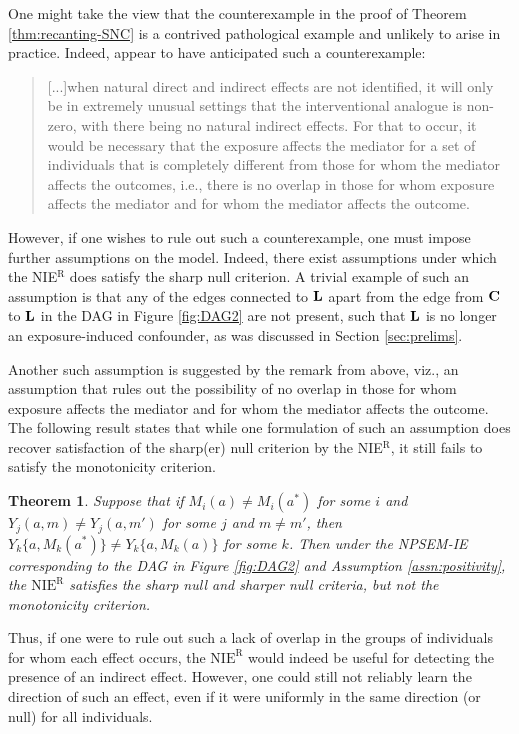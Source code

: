 \documentclass[12pt]{article}
\newtheorem{theorem}{Theorem}
\begin{document}
One might take the view that the counterexample in the proof of Theorem \ref{thm:recanting-SNC} is a contrived pathological example and unlikely to arise in practice. Indeed, \cite{vanderweele2017mediation} appear to have anticipated such a counterexample:
\begin{quote}
    [...]when natural direct and indirect effects are not identified, it will only be in extremely unusual settings that the interventional analogue is non-zero, with there being no natural indirect effects. For that to occur, it would be necessary that the exposure affects the mediator for a set of individuals that is completely different from those for whom the mediator affects the outcomes, i.e., there is no overlap in those for whom exposure affects the mediator and for whom the mediator affects the outcome.
\end{quote}
However, if one wishes to rule out such a counterexample, one must impose further assumptions on the model. Indeed, there exist assumptions under which the NIE$^{\mathrm{R}}$ does satisfy the sharp null criterion. A trivial example of such an assumption is that any of the edges connected to ${\bf L}$ apart from the edge from ${\bf C}$ to ${\bf L}$ in the DAG in Figure \ref{fig:DAG2} are not present, such that ${\bf L}$ is no longer an exposure-induced confounder, as was discussed in Section \ref{sec:prelims}.

Another such assumption is suggested by the remark from \cite{vanderweele2017mediation} above, viz., an assumption that rules out the possibility of no overlap in those for whom exposure affects the mediator and for whom the mediator affects the outcome. The following result states that while one formulation of such an assumption does recover satisfaction of the sharp(er) null criterion by the NIE$^{\text{R}}$, it still fails to satisfy the monotonicity criterion.
\begin{theorem}
    \label{thm:overlap}
    Suppose that if $M_i(a)\neq M_i(a^*)$ for some $i$ and $Y_j(a,m)\neq Y_j(a,m')$ for some $j$ and $m\neq m'$, %
    then $Y_{k}\{a,M_k(a^*)\}\neq Y_{k}\{a,M_k(a)\}$ for some $k$. 
    Then under the NPSEM-IE corresponding to the DAG in Figure \ref{fig:DAG2} and Assumption \ref{assn:positivity}, the $\text{NIE}^{\mathrm{R}}$ satisfies the sharp null and sharper null criteria, but not the monotonicity criterion.
\end{theorem}
Thus, if one were to rule out such a lack of overlap in the groups of individuals for whom each effect occurs, the $\text{NIE}^{\mathrm{R}}$ would indeed be useful for detecting the presence of an indirect effect. However, one could still not reliably learn the direction of such an effect, even if it were uniformly in the same direction (or null) for all individuals.
\end{document}
